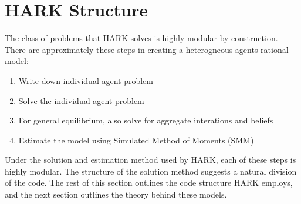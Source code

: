 \message{ !name(ccarroll_et_al_scipy_2018.tex)}\documentclass[10pt,twocolumn]{article}
\providecommand{\tightlist}{%
  \setlength{\itemsep}{0pt}\setlength{\parskip}{0pt}}
\begin{document}
\section{\texorpdfstring{HARK Structure
\label{sec:hark-structure}}{HARK Structure }}\label{hark-structure}

\href{Methodological\%20Framework\%20...\%20of\%20the\%20HARK\%20Framework}{}

The class of problems that HARK solves is highly modular by construction. There are approximately these steps in creating a heterogneous-agents rational model:
\begin{enumerate}
\def\labelenumi{\arabic{enumi}.}
\tightlist
\item
  Write down individual agent problem
\item
  Solve the individual agent problem
\item
  For general equilibrium, also solve for aggregate interations and
  beliefs
\item
  Estimate the model using Simulated Method of Moments (SMM)
\end{enumerate}

Under the solution and estimation method used by HARK, each of these
steps is highly modular. The structure of the solution method suggests a
natural division of the code. The rest of this section outlines the code
structure HARK employs, and the next section outlines the theory behind
these models.
\end{document}
